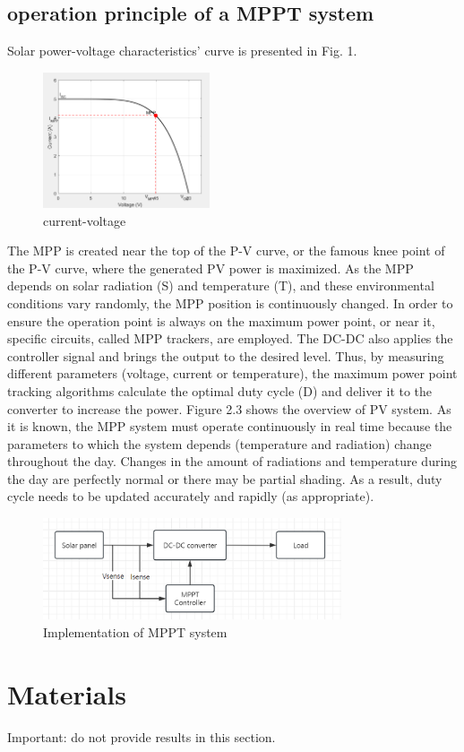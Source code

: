 \subsection{operation principle of a MPPT system}
Solar power-voltage characteristics' curve is presented in Fig. 1.
\begin{figure}[h]
	\centering\includegraphics[height=4cm]{./images/current-voltage}
	\caption{current-voltage}
\end{figure}
The MPP is created near the top of the P-V curve, or the famous knee point of the P-V curve, where the generated PV power is maximized. As the MPP depends on solar radiation (S) and temperature (T), and these environmental conditions vary randomly, the MPP position is continuously changed. In order to ensure the operation point is always on the maximum power point, or near it, specific circuits, called MPP trackers, are employed. The DC-DC also applies the controller signal and brings the output to the desired level. Thus, by measuring different parameters (voltage, current or temperature), the maximum power point tracking algorithms calculate the optimal duty cycle (D) and deliver it to the converter to increase the power. Figure 2.3 shows the overview of PV system.
As it is known, the MPP system must operate continuously in real time because the parameters to which the system depends (temperature and radiation) change throughout the day. Changes in the amount of radiations and temperature during the day are  perfectly normal or there may be partial shading. As a result, duty cycle needs to be updated accurately and rapidly (as appropriate).

\begin{figure}[h]
	\centering\includegraphics[height=3cm]{./images/Implementation of MPPT system}
	\caption{Implementation of MPPT system}
\end{figure}


\section{Materials}



Important: do not provide results in this section.


